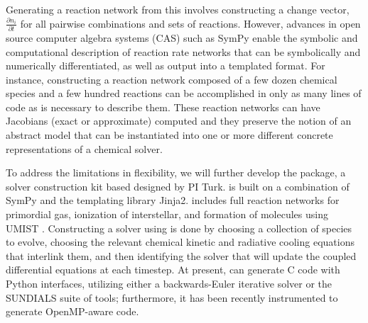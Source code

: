
Generating a reaction network from this involves constructing a change vector,
$\frac{\partial n_i}{\partial t}$ for all pairwise combinations and sets of
reactions.
However, advances in open source computer algebra systems (CAS) such as SymPy
\citep{10.7717/peerj-cs.103} enable the symbolic and computational description
of reaction rate networks that can be symbolically and numerically
differentiated, as well as output into a templated format.  For instance,
constructing a reaction network composed of a few dozen chemical species and a
few hundred reactions can be accomplished in only as many lines of code as is
necessary to describe them.  These reaction networks can have Jacobians (exact
or approximate) computed and they preserve the notion of an abstract model that
can be instantiated into one or more different concrete representations of a
chemical solver.


To address the limitations in  flexibility, we will
further develop the \dengo{} package, a solver construction kit based
designed by PI Turk. \dengo{} is built on a combination of SymPy and
the templating library Jinja2. \dengo{} includes full reaction
networks for primordial gas, ionization of 
interstellar, and formation of molecules using UMIST
\citep{2013A&A...550A..36M}.  Constructing a solver using \dengo{} is done by
choosing a collection of species to evolve, choosing the relevant chemical
kinetic and radiative cooling equations that interlink them, and then
identifying the solver that will update the coupled differential equations at
each timestep. At present, \dengo{} can generate C code with Python
interfaces, utilizing either a backwards-Euler iterative solver or the SUNDIALS
suite of tools; furthermore, it has been recently instrumented to generate
OpenMP-aware code.


